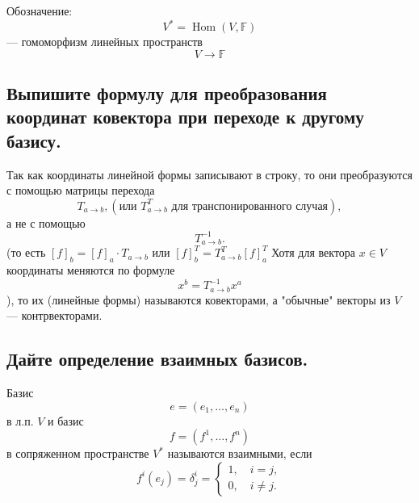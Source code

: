 \begin{remark}
    Обозначение:
    \[
        V^* = \operatorname{Hom}(V, \mathbb{F})
    \]
    --- гомоморфизм линейных пространств
    \[
        V \to \mathbb{F}
    \]
\end{remark}

\subsection{Выпишите формулу для преобразования координат ковектора при переходе к другому базису.}

\begin{remark}
    Так как координаты линейной формы записывают в строку, то они преобразуются с помощью матрицы перехода
    \[
        T_{a \to b}, (\text{или } T_{a \to b}^T \text{ для транспонированного случая}),
    \]
    а не с помощью
    \[
        T_{a \to b}^{-1}.
    \]
    (то есть
    $
        [f]_b = [f]_a \cdot T_{a \to b}
    $
    или
    $
        [f]_b^T = T_{a \to b}^T [f]_a^T
    $
    Хотя для вектора $x \in V$ координаты меняются по формуле
    \[
        x^b = T_{a \to b}^{-1}x^a
    \]),
    то их (линейные формы) называются ковекторами, а "обычные"  векторы из $V$ --- контрвекторами.
\end{remark}

\subsection{Дайте определение взаимных базисов.}
\begin{definition}
    Базис
    \[
        e = (e_1,\ldots, e_n)
    \]
    в л.п. $V$ и базис
    \[
        f = (f^1,\ldots, f^n)
    \]
    в сопряженном пространстве $V^*$
    называются взаимными, если
    \[
        f^i(e_j)=\delta_j^i
        =
        \begin{cases}
            1,\quad i=j,\\
            0,\quad i\neq j.
        \end{cases}
    \]
\end{definition}